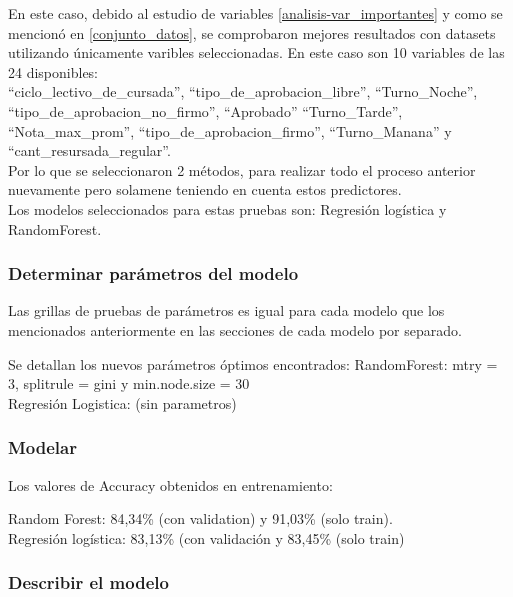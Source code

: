 En este caso, debido al estudio de variables \ref{analisis-var_importantes} y como se mencionó en \ref{conjunto_datos}, se comprobaron mejores resultados
con datasets utilizando únicamente varibles seleccionadas. En este caso son 10 variables de las 24 disponibles:\\

``ciclo\_lectivo\_de\_cursada'', ``tipo\_de\_aprobacion\_libre'',
``Turno\_Noche'', ``tipo\_de\_aprobacion\_no\_firmo'', ``Aprobado''
``Turno\_Tarde'', ``Nota\_max\_prom'', ``tipo\_de\_aprobacion\_firmo'',
``Turno\_Manana'' y ``cant\_resursada\_regular''.\\


Por lo que se seleccionaron 2 métodos, para realizar todo el proceso
anterior nuevamente pero solamene teniendo en cuenta estos predictores.\\


Los modelos seleccionados para estas pruebas son: Regresión logística y
RandomForest.


\subsubsection{Determinar parámetros del modelo}

Las grillas de pruebas de parámetros es igual para cada modelo que los
mencionados anteriormente en las secciones de cada modelo por separado.

Se detallan los nuevos parámetros óptimos encontrados: 
RandomForest: mtry = 3, splitrule = gini y min.node.size = 30\\
Regresión Logistica: (sin parametros)

\subsubsection{Modelar}

Los valores de Accuracy obtenidos en entrenamiento:

Random Forest: 84,34\% (con validation) y 91,03\% (solo train).\\

Regresión logística: 83,13\% (con validación y 83,45\% (solo train)



\subsubsection{Describir el modelo}

